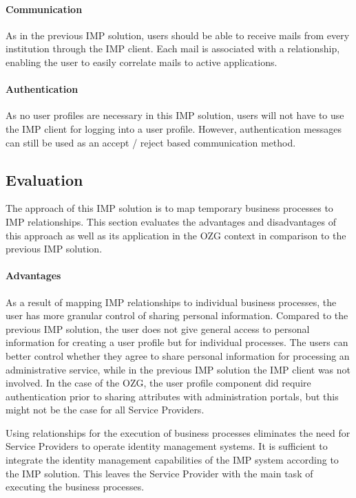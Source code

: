 \paragraph{Communication}

As in the previous IMP solution, users should be able to receive mails from every institution through the IMP client. Each mail is associated with a relationship, enabling the user to easily correlate mails to active applications.

\paragraph{Authentication}

As no user profiles are necessary in this IMP solution, users will not have to use the IMP client for logging into a user profile. However, authentication messages can still be used as an accept / reject based communication method.

\subsection{Evaluation}
The approach of this IMP solution is to map temporary business processes to IMP relationships. This section evaluates the advantages and disadvantages of this approach as well as its application in the OZG context in comparison to the previous IMP solution.

\paragraph{Advantages}

As a result of mapping IMP relationships to individual business processes, the user has more granular control of sharing personal information. Compared to the previous IMP solution, the user does not give general access to personal information for creating a user profile but for individual processes. The users can better control whether they agree to share personal information for processing an administrative service, while in the previous IMP solution the IMP client was not involved. In the case of the OZG, the user profile component did require authentication prior to sharing attributes with administration portals, but this might not be the case for all Service Providers.

Using relationships for the execution of business processes eliminates the need for Service Providers to operate identity management systems. It is sufficient to integrate the identity management capabilities of the IMP system according to the IMP solution. This leaves the Service Provider with the main task of executing the business processes. 

